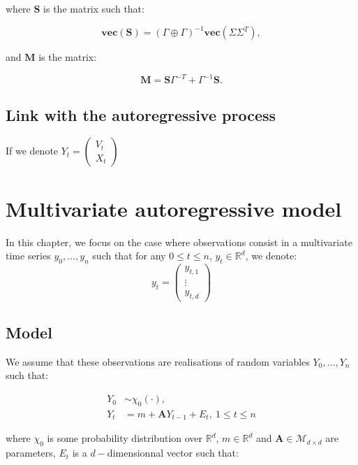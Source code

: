 \documentclass[]{book}
\newcommand{\inv}{^{-1}}
\newcommand{\GpG}{\left( \Gamma \oplus \Gamma \right)}
\newcommand{\Vect}[1]{\textbf{vec}\left(#1 \right)}
\newcommand{\Sinf}{\mathbf{S}}
\newcommand{\M}{\mathbf{M}}
\begin{document}
where \(\Sinf\) is the matrix such that:

\begin{equation*}
\Vect{\Sinf} = \GpG\inv\Vect{\Sigma \Sigma^T}, 
\end{equation*}

and \(\M\) is the matrix:

\begin{equation*}
\M= \Sinf\Gamma^{-T} + \Gamma\inv\Sinf.
\end{equation*}

\section{Link with the autoregressive
process}\label{link-with-the-autoregressive-process}

If we denote \(Y_t = \begin{pmatrix} V_{t} \\ X_{t} \end{pmatrix}\)

\chapter{Multivariate autoregressive model}\label{simpleAR}

In this chapter, we focus on the case where observations consist in a
multivariate time series \(y_0, \dots, y_n\) such that for any
\(0\leq t \leq n\), \(y_t \in \mathbb{R}^d\), we denote: \[y_t = 
\begin{pmatrix}
y_{t,1}\\
\vdots\\
y_{t, d}
\end{pmatrix}\]

\section{Model}\label{model}

We assume that these observations are realisations of random variables
\(Y_0,\dots, Y_n\) such that:

\begin{align}
Y_0 &\sim \chi_0(\cdot),\nonumber \\
Y_t &= m + \mathbf{A}Y_{t -1} + E_t,~1\leq t \leq n \label{eq:AR-simple}
\end{align}

where \(\chi_0\) is some probability distribution over \(\mathbb{R}^d\),
\(m\in\mathbb{R}^d\) and \(\mathbf{A}\in \mathcal{M}_{d\times d}\) are
parameters, \(E_t\) is a \(d-\)dimensionnal vector such that:
\end{document}
